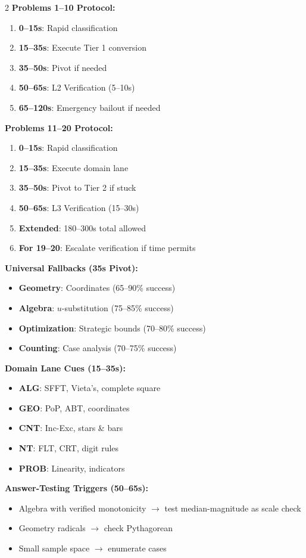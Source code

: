 \documentclass{article}
\begin{document}
\begin{tcolorbox}[colback=blue!5!white,colframe=blue!75!black,title={\textbf{Competition Day Quick Reference}}]
\begin{multicols}{2}
\textbf{Problems 1--10 Protocol:}
\begin{enumerate}[nosep]
\item \textbf{0--15s}: Rapid classification
\item \textbf{15--35s}: Execute Tier 1 conversion
\item \textbf{35--50s}: Pivot if needed
\item \textbf{50--65s}: L2 Verification (5--10s)
\item \textbf{65--120s}: Emergency bailout if needed
\end{enumerate}

\textbf{Problems 11--20 Protocol:}
\begin{enumerate}[nosep]
\item \textbf{0--15s}: Rapid classification
\item \textbf{15--35s}: Execute domain lane
\item \textbf{35--50s}: Pivot to Tier 2 if stuck
\item \textbf{50--65s}: L3 Verification (15--30s)
\item \textbf{Extended}: 180--300s total allowed
\item \textbf{For 19--20}: Escalate verification if time permits
\end{enumerate}

\textbf{Universal Fallbacks (35s Pivot):}
\begin{itemize}[nosep]
\item \textbf{Geometry}: Coordinates (65--90\% success)
\item \textbf{Algebra}: $u$-substitution (75--85\% success)
\item \textbf{Optimization}: Strategic bounds (70--80\% success)
\item \textbf{Counting}: Case analysis (70--75\% success)
\end{itemize}

\textbf{Domain Lane Cues (15--35s):}
\begin{itemize}[nosep]
\item \textbf{ALG}: SFFT, Vieta's, complete square
\item \textbf{GEO}: PoP, ABT, coordinates
\item \textbf{CNT}: Inc-Exc, stars \& bars
\item \textbf{NT}: FLT, CRT, digit rules
\item \textbf{PROB}: Linearity, indicators
\end{itemize}

\textbf{Answer-Testing Triggers (50--65s):}
\begin{itemize}[nosep]
\item Algebra with verified monotonicity $\rightarrow$ test median-magnitude as scale check
\item Geometry radicals $\rightarrow$ check Pythagorean
\item Small sample space $\rightarrow$ enumerate cases
\end{itemize}


\end{multicols}
\end{tcolorbox}
\end{document}
